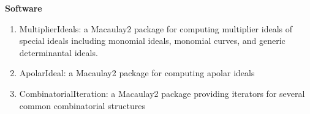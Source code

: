 \documentclass[12pt]{article}
\begin{document}
\textbf{Software}
\begin{enumerate}[revarabic]

\item MultiplierIdeals:
a Macaulay2 package for computing multiplier ideals of special ideals including monomial ideals, monomial curves, and generic determinantal ideals.

\item ApolarIdeal:
a Macaulay2 package for computing apolar ideals

\item CombinatorialIteration:
a Macaulay2 package providing iterators for several common combinatorial structures

\end{enumerate}


%
%




\end{document}

